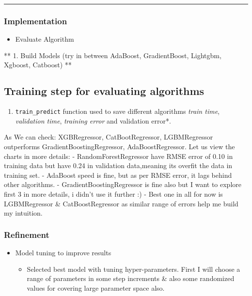 \documentclass[11pt]{article}
\providecommand{\tightlist}{%
      \setlength{\itemsep}{0pt}\setlength{\parskip}{0pt}}
\begin{document}
\begin{center}\rule{0.5\linewidth}{\linethickness}\end{center}

    \hypertarget{implementation}{%
\subsubsection{Implementation}\label{implementation}}

    \begin{itemize}
\tightlist
\item
  Evaluate Algorithm
\end{itemize}

    ** 1. Build Models (try in between AdaBoost, GradientBoost, Lightgbm,
Xgboost, Catboost) **

    \hypertarget{training-step-for-evaluating-algorithms}{%
\subsection{Training step for evaluating
algorithms}\label{training-step-for-evaluating-algorithms}}

\begin{enumerate}
\def\labelenumi{\arabic{enumi}.}
\tightlist
\item
  \texttt{train\_predict} function used to save different algorithms
  \emph{train time}, \emph{validation time}, \emph{training error} and
  validation error*.
\end{enumerate}

    As We can check: XGBRegressor, CatBootRegressor, LGBMRegressor
outperforms GradientBoostingRegressor, AdaBoostRegressor. Let us view
the charts in more details: - RandomForestRegressor have RMSE error of
0.10 in training data but have 0.24 in validation data,meaning its
overfit the data in training set. - AdaBoost speed is fine, but as per
RMSE error, it lags behind other algorithms. - GradientBoostingRegressor
is fine also but I want to explore first 3 in more details, i didn't use
it further :) - Best one in all for now is LGBMRegressor \&
CatBoostRegressor as similar range of errors help me build my intuition.

    \hypertarget{refinement}{%
\subsubsection{Refinement}\label{refinement}}

    \begin{itemize}
\tightlist
\item
  Model tuning to improve results

  \begin{itemize}
  \tightlist
  \item
    Selected best model with tuning hyper-parameters. First I will
    choose a range of parameters in some step increments \& also some
    randomized values for covering large parameter space also.
  \end{itemize}
\end{itemize}
\end{document}
